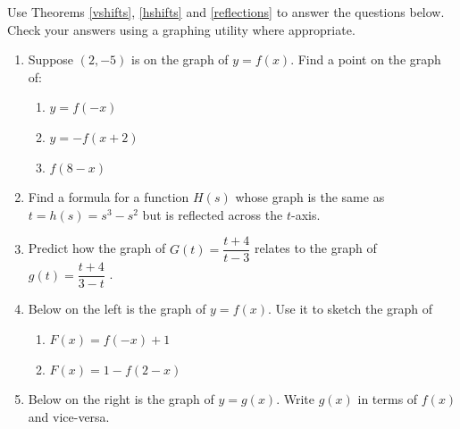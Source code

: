 \begin{ex}  \label{reflectionsex}  

Use Theorems  \ref{vshifts},  \ref{hshifts} and \ref{reflections}  to answer the questions below.  Check your answers using a graphing utility where appropriate.
 
 \begin{enumerate}
 
 \item   Suppose $(2,-5)$ is on the graph of $y = f(x)$.  Find a point on the graph of:
 
 \begin{multicols}{3}
 
 \begin{enumerate}
 
 \item $y = f(-x)$
 
 \item $y = -f(x+2)$
 
 \item  \label{twotransxrefex} $f(8-x)$
 
 \end{enumerate}
 
 \end{multicols}
 
 \item  Find a formula for a function $H(s)$ whose graph is the same as $t=h(s) = s^3-s^2$ but is reflected across the $t$-axis.
 
 \item Predict how the graph of $G(t) = \dfrac{t+4}{t-3}$ relates to the graph of $g(t) =\dfrac{t+4}{3-t}$ . 
 
\item  Below on the left is the graph of $y = f(x)$.  Use it to sketch the graph of

  \begin{multicols}{2}
 
 \begin{enumerate}
 
 \item $F(x) = f(-x)+1$
 
  \item \label{twotransyrefex}  $F(x)= 1 - f(2-x)$
 
 \end{enumerate}
 
 \end{multicols}
 
 \item \label{gfromfrefex} Below on the right is the graph of $y = g(x)$.  Write $g(x)$ in terms of $f(x)$ and vice-versa.
 

\end{enumerate}
\end{ex}
